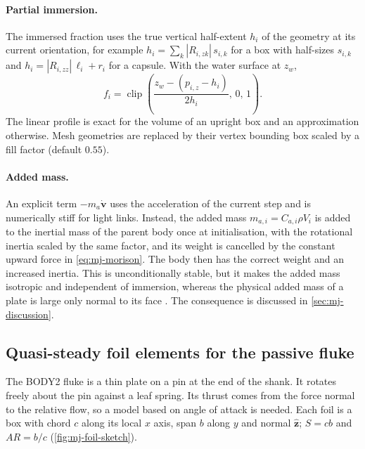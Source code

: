 \paragraph{Partial immersion.}
The immersed fraction uses the true vertical half-extent $h_i$ of the geometry at
its current orientation, for example
$h_i=\sum_k|R_{i,zk}|\,s_{i,k}$ for a box with half-sizes $s_{i,k}$ and
$h_i=|R_{i,zz}|\,\ell_i+r_i$ for a capsule. With the water surface at $z_w$,
\begin{equation}
  f_i=\operatorname{clip}\!\left(\frac{z_w-(p_{i,z}-h_i)}{2h_i},\,0,\,1\right).
  \label{eq:mj-immersion}
\end{equation}
The linear profile is exact for the volume of an upright box and an approximation
otherwise. Mesh geometries are replaced by their vertex bounding box scaled by a fill
factor (default $0.55$).

\paragraph{Added mass.}
An explicit term $-m_a\dot{\bm v}$ uses the acceleration of the current step and
is numerically stiff for light links. Instead, the added mass
$m_{a,i}=C_{a,i}\rho V_i$ is added to the inertial mass of the parent body once at
initialisation, with the rotational inertia scaled by the same factor, and its weight
is cancelled by the constant upward force in \cref{eq:mj-morison}. The body then has
the correct weight and an increased inertia. This is unconditionally stable, but it
makes the added mass isotropic and independent of immersion, whereas the physical
added mass of a plate is large only normal to its face \cite{Newman1977}. The
consequence is discussed in \cref{sec:mj-discussion}.

\subsection{Quasi-steady foil elements for the passive fluke}
\label{sec:mj-foil}

The BODY2 fluke is a thin plate on a pin at the end of the shank. It rotates freely
about the pin against a leaf spring. Its thrust comes from the force normal to the
relative flow, so a model based on angle of attack is needed. Each foil is a box
with chord $c$ along its local $x$ axis, span $b$ along $y$ and normal $\hat{\bm z}$;
$S=cb$ and $\mathit{AR}=b/c$ (\cref{fig:mj-foil-sketch}).

